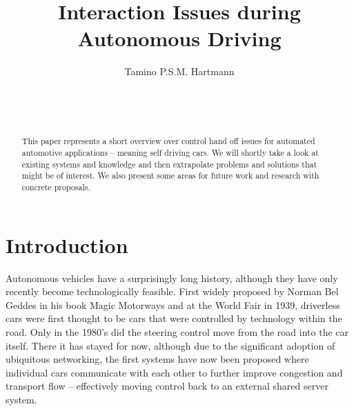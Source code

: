 \documentclass{acm_proc_article-sp}
\begin{document}

\title{Interaction Issues during Autonomous Driving}

\author{
\alignauthor
Tamino P.S.M. Hartmann\\
       \\
       \\
       \\
}


\maketitle
\begin{abstract}
This paper represents a short overview over control hand off issues for automated automotive applications – meaning self driving cars.
We will shortly take a look at existing systems and knowledge and then extrapolate problems and solutions that might be of interest.
We also present some areas for future work and research with concrete proposals.
\end{abstract}


\section{Introduction}

Autonomous vehicles have a surprisingly long history, although they have only recently become technologically feasible.
First widely proposed by Norman Bel Geddes in his book Magic Motorways \cite{geddes2009magic} and at the World Fair in 1939, driverless cars were first thought to be cars that were controlled by technology within the road.
Only in the 1980's did the steering control move from the road into the car itself.
There it has stayed for now, although due to the significant adoption of ubiquitous networking, the first systems have now been proposed where individual cars communicate with each other to further improve congestion and transport flow – effectively moving control back to an external shared server system.
\end{document}

